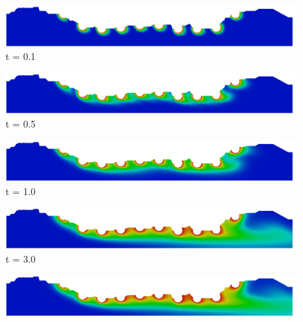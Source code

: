 \begin{figure}[H]
     \begin{minipage}{.50\linewidth}
      \centering
      \includegraphics[scale=0.12]{./02_chaps/cap_solution/figure/conc1_RealStrut200.png}\\
      t = 0.1
     \end{minipage}%
     \begin{minipage}{.50\linewidth}
      \centering
      \includegraphics[scale=0.12]{./02_chaps/cap_solution/figure/conc1_RealStrut1000.png}\\
      t = 0.5
     \end{minipage}
     \begin{minipage}{.50\linewidth}
     \medskip
      \centering
      \includegraphics[scale=0.12]{./02_chaps/cap_solution/figure/conc1_RealStrut2000.png}\\
      t = 1.0
     \end{minipage}%
     \begin{minipage}{.50\linewidth}
     \medskip
      \centering
      \includegraphics[scale=0.12]{./02_chaps/cap_solution/figure/conc1_RealStrut6000.png}\\
      t = 3.0
     \end{minipage}
     \begin{minipage}{.50\linewidth}
      \centering
      \includegraphics[scale=0.12]{./02_chaps/cap_solution/figure/conc1_RealStrut8000.png}\\

\end{minipage}
\end{figure}
